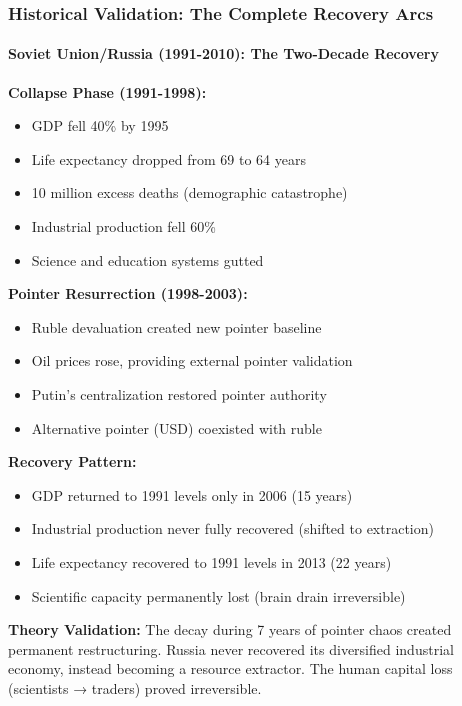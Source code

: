 \documentclass[11pt,oneside]{book}
\begin{document}
\subsubsection{Historical Validation: The Complete Recovery Arcs}

\paragraph{Soviet Union/Russia (1991-2010): The Two-Decade Recovery}

\textbf{Collapse Phase (1991-1998):}
\begin{itemize}
\item GDP fell 40\% by 1995
\item Life expectancy dropped from 69 to 64 years
\item 10 million excess deaths (demographic catastrophe)
\item Industrial production fell 60\%
\item Science and education systems gutted
\end{itemize}

\textbf{Pointer Resurrection (1998-2003):}
\begin{itemize}
\item Ruble devaluation created new pointer baseline
\item Oil prices rose, providing external pointer validation
\item Putin's centralization restored pointer authority
\item Alternative pointer (USD) coexisted with ruble
\end{itemize}

\textbf{Recovery Pattern:}
\begin{itemize}
\item GDP returned to 1991 levels only in 2006 (15 years)
\item Industrial production never fully recovered (shifted to extraction)
\item Life expectancy recovered to 1991 levels in 2013 (22 years)
\item Scientific capacity permanently lost (brain drain irreversible)
\end{itemize}

\textbf{Theory Validation:} The decay during 7 years of pointer chaos created permanent restructuring. Russia never recovered its diversified industrial economy, instead becoming a resource extractor. The human capital loss (scientists → traders) proved irreversible.
\end{document}
